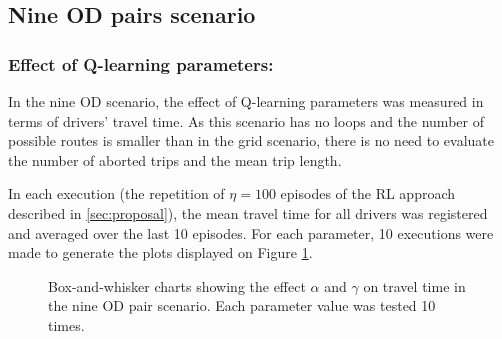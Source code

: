 \documentclass{RITA}
\newcommand{\numepis}{\ensuremath{\eta}}	%
\begin{document}
\subsection{Nine OD pairs scenario}

\subsubsection{Effect of Q-learning parameters:}
\label{sec:qlParamsNineOD}
In the nine OD scenario, the effect of Q-learning parameters was measured in terms of drivers' travel time. As this scenario has no loops and the number of possible routes is smaller than in the grid scenario, there is no need to evaluate the number of aborted trips and the mean trip length.

In each execution (the repetition of $\numepis = 100$ episodes of the RL approach described in \ref{sec:proposal}), the mean travel time for all drivers was registered and averaged over the last 10 episodes.  For each parameter, 10 executions were made to generate the plots displayed on Figure \ref{fig:qLearningParams}.

\begin{figure}
  \centering
  \caption{Box-and-whisker charts showing the effect $\alpha$ and $\gamma$ on travel time in the nine OD pair scenario. Each parameter value was tested 10 times.}
  \label{fig:qLearningParams}
\end{figure}
\end{document}
